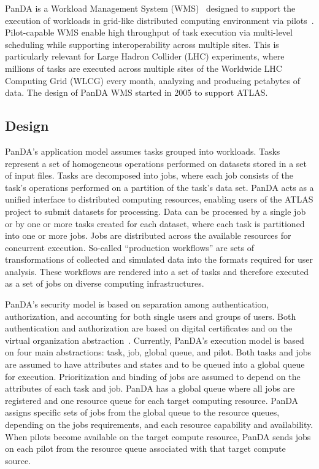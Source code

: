 PanDA is a Workload Management System (WMS)~\cite{marco2009glite} designed to
support the execution of workloads in grid-like distributed computing
environment via pilots~\cite{turilli2017comprehensive}. Pilot-capable WMS
enable high throughput of task execution via multi-level scheduling while
supporting interoperability across multiple sites. This is particularly
relevant for Large Hadron Collider (LHC) experiments, where millions of tasks
are executed across multiple sites of the Worldwide LHC Computing Grid (WLCG)
every month, analyzing and producing petabytes of data. The design of PanDA WMS
started in 2005 to support ATLAS.

\subsection{Design}
\label{subsec:design}

PanDA's application model assumes tasks grouped into workloads. Tasks
represent a set of homogeneous operations performed on datasets stored in a
set of input files. Tasks are decomposed into jobs, where each job consists
of the task's operations performed on a partition of the task's data set.
PanDA acts as a unified interface to distributed computing resources,
enabling users of the ATLAS project to submit datasets for processing. Data
can be processed by a single job or by one or more tasks created for each
dataset, where each task is partitioned into one or more jobs. Jobs are
distributed across the available resources for concurrent execution. So-called
``production workflows'' are sets of transformations of collected and
simulated data into the formats required for user analysis. These workflows are
rendered into a set of tasks and therefore executed as a set of jobs on diverse
computing infrastructures.

PanDA's security model is based on separation among authentication,
authorization, and accounting for both single users and groups of users. Both
authentication and authorization are based on digital certificates and on the
virtual organization abstraction~\cite{foster2001anatomy}. Currently, PanDA's
execution model is based on four main abstractions: task, job, global queue,
and pilot. Both tasks and jobs are assumed to have attributes and states and
to be queued into a global queue for execution. Prioritization and binding of
jobs are assumed to depend on the attributes of each task and job. PanDA has
a global queue where all jobs are registered and one resource queue for each
target computing resource. PanDA assigns specific sets of jobs from the global
queue to the resource queues, depending on the jobs requirements, and each
resource capability and availability. When pilots become available on the
target compute resource, PanDA sends jobs on each pilot from the resource queue
associated with that target compute source.

